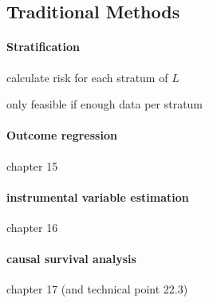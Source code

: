 \documentclass[8pt]{extarticle}
\begin{document}
\subsection{Traditional Methods}

\begin{multicols}{2}




\paragraph{\large Stratification}  calculate risk for each stratum of $L$

\noindent only feasible if enough data per stratum
















\paragraph{Outcome regression} chapter 15

\paragraph{instrumental variable estimation} chapter 16

\paragraph{causal survival analysis} chapter 17 (and technical point 22.3)







\end{multicols}




\end{document}
